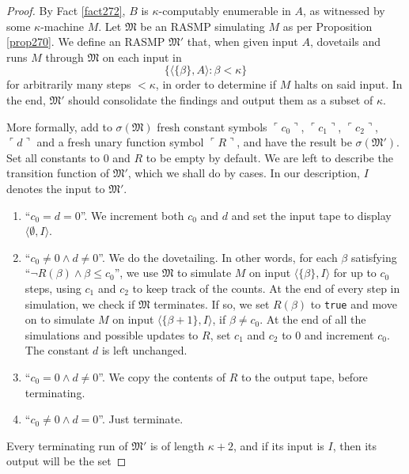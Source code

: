 \documentclass[12pt]{article}
\numberwithin{equation}{section}
\begin{document}
\begin{proof}
By Fact \ref{fact272}, $B$ is $\kappa$-computably enumerable in $A$, as witnessed by some $\kappa$-machine $M$. Let $\mathfrak{M}$ be an RASMP simulating $M$ as per Proposition \ref{prop270}. We define an RASMP $\mathfrak{M}'$ that, when given input $A$, dovetails and runs $M$ through $\mathfrak{M}$ on each input in
\begin{equation*}
    \{\langle \{\beta\}, A \rangle : \beta < \kappa\}
\end{equation*}
for arbitrarily many steps $< \kappa$, in order to determine if $M$ halts on said input. In the end, $\mathfrak{M}'$ should consolidate the findings and output them as a subset of $\kappa$.

More formally, add to $\sigma(\mathfrak{M})$ fresh constant symbols $\ulcorner c_0 \urcorner$, $\ulcorner c_1 \urcorner$, $\ulcorner c_2 \urcorner$, $\ulcorner d \urcorner$ and a fresh unary function symbol $\ulcorner R \urcorner$, and have the result be $\sigma(\mathfrak{M}')$. Set all constants to $0$ and $R$ to be empty by default. We are left to describe the transition function of $\mathfrak{M}'$, which we shall do by cases. In our description, $I$ denotes the input to $\mathfrak{M}'$.
\begin{enumerate}[leftmargin=60pt, label=Case \arabic*:]
    \item ``$c_0 = d = 0$''. We increment both $c_0$ and $d$ and set the input tape to display $\langle \emptyset, I \rangle$.
    \item ``$c_0 \neq 0 \wedge d \neq 0$''. We do the dovetailing. In other words, for each $\beta$ satisfying ``$\neg R(\beta) \wedge \beta \leq c_0$'', we use $\mathfrak{M}$ to simulate $M$ on input $\langle \{\beta\}, I \rangle$ for up to $c_0$ steps, using $c_1$ and $c_2$ to keep track of the counts. At the end of every step in simulation, we check if $\mathfrak{M}$ terminates. If so, we set $R(\beta)$ to \texttt{true} and move on to simulate $M$ on input $\langle \{\beta + 1\}, I \rangle$, if $\beta \neq c_0$. At the end of all the simulations and possible updates to $R$, set $c_1$ and $c_2$ to $0$ and increment $c_0$. The constant $d$ is left unchanged.
    \item ``$c_0 = 0 \wedge d \neq 0$''. We copy the contents of $R$ to the output tape, before terminating.
    \item ``$c_0 \neq 0 \wedge d = 0$''. Just terminate.
\end{enumerate}
Every terminating run of $\mathfrak{M}'$ is of length $\kappa + 2$, and if its input is $I$, then its output will be the set

\end{proof}
\end{document}
